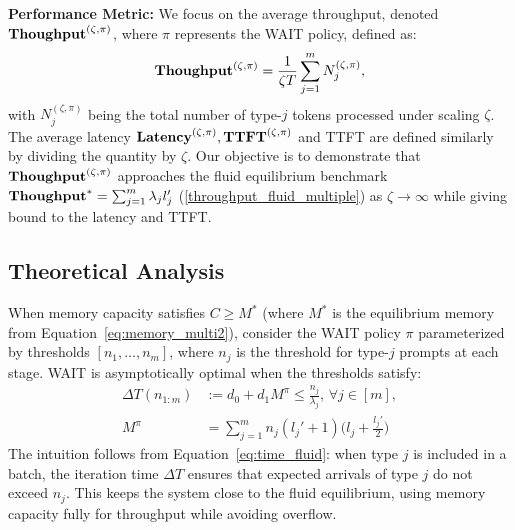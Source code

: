 


\textbf{Performance Metric:} We focus on the average throughput, denoted $\textbf{Thoughput}^{(\zeta, \pi)}$, where $\pi$ represents the WAIT policy, defined as:
\[
\textbf{Thoughput}^{(\zeta, \pi)} = \frac{1}{\zeta T} \sum_{j=1}^m N_j^{(\zeta, \pi)},
\]
with $N_j^{(\zeta, \pi)}$ being the total number of type-$j$ tokens processed under scaling $\zeta$. The average latency $\textbf{Latency}^{(\zeta,\pi)},\textbf{TTFT}^{(\zeta,\pi)}$ and TTFT are defined similarly by dividing the quantity by $\zeta$. Our objective is to demonstrate that $\textbf{Thoughput}^{(\zeta, \pi)}$ approaches the fluid equilibrium benchmark $\textbf{Thoughput}^* = \sum_{j=1}^m \lambda_j l_j'$ (\ref{throughput_fluid_multiple}) as $\zeta \to \infty$ while giving bound to the latency and TTFT.

\subsection{Theoretical Analysis}
\label{subsec:main_theorem}
When memory capacity satisfies \(C \geq M^*\) (where $M^*$ is the equilibrium memory from Equation~\eqref{eq:memory_multi2}), consider the WAIT policy \(\pi\) parameterized by thresholds \([n_1, \dots, n_m]\), where \(n_j\) is the threshold for type-$j$ prompts at each stage. WAIT is asymptotically optimal when the thresholds satisfy:
\begin{equation}
\label{eq:wait_thresholds}
\begin{aligned}
\Delta T(n_{1:m}) &:= d_0 + d_1 M^{\pi} \leq \tfrac{n_j}{\lambda_j},\, \forall j\in[m],\\
 M^{\pi} &= \sum_{j=1}^m n_j (l_j' + 1) \big(l_j + \tfrac{l_j'}{2}\big)
\end{aligned}
\end{equation}
The intuition follows from Equation~\eqref{eq:time_fluid}: when type $j$ is included in a batch, the iteration time $\Delta T$ ensures that expected arrivals of type $j$ do not exceed $n_j$. This keeps the system close to the fluid equilibrium, using memory capacity fully for throughput while avoiding overflow.

